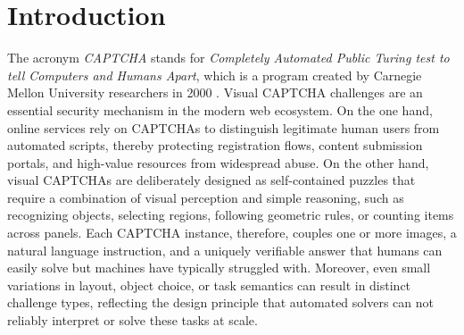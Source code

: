 \documentclass[sigconf, review]{acmart}
\begin{document}





\maketitle

\section{Introduction}

The acronym \textit{CAPTCHA} stands for \textit{Completely Automated Public Turing test to tell Computers and Humans Apart}, which is a program created by Carnegie Mellon University researchers in 2000 \cite{10.1145/966389.966390}. Visual CAPTCHA challenges are an essential security mechanism in the modern web ecosystem. On the one hand, online services rely on CAPTCHAs to distinguish legitimate human users from automated scripts, thereby protecting registration flows, content submission portals, and high-value resources from widespread abuse. On the other hand, visual CAPTCHAs are deliberately designed as self-contained puzzles that require a combination of visual perception and simple reasoning, such as recognizing objects, selecting regions, following geometric rules, or counting items across panels. Each CAPTCHA instance, therefore, couples one or more images, a natural language instruction, and a uniquely verifiable answer that humans can easily solve but machines have typically struggled with. Moreover, even small variations in layout, object choice, or task semantics can result in distinct challenge types, reflecting the design principle that automated solvers can not reliably interpret or solve these tasks at scale.
\end{document}
